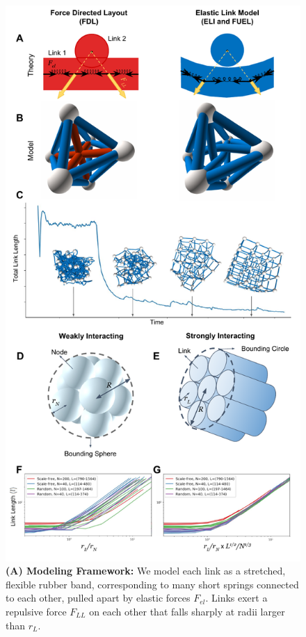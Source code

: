 \documentclass[nofootinbib,preprint,floatfix,titlepage,superscriptaddress]{revtex4} %
\begin{document}
\begin{figure}
    \centering
    \includegraphics[width=.7\columnwidth]{fig-09-19/3d-crs-lat-trans-110317.pdf}
    \caption{
    \scriptsize
    {\bf(A) Modeling Framework:} We model each link as a stretched, flexible rubber band, %
    corresponding to many short springs connected to each other, pulled apart by
    elastic forces $F_{el}$. %
    Links exert a repulsive force $F_{LL}$  on each other that falls sharply at radii larger than $r_L$. 
}
\end{figure}
\end{document}
